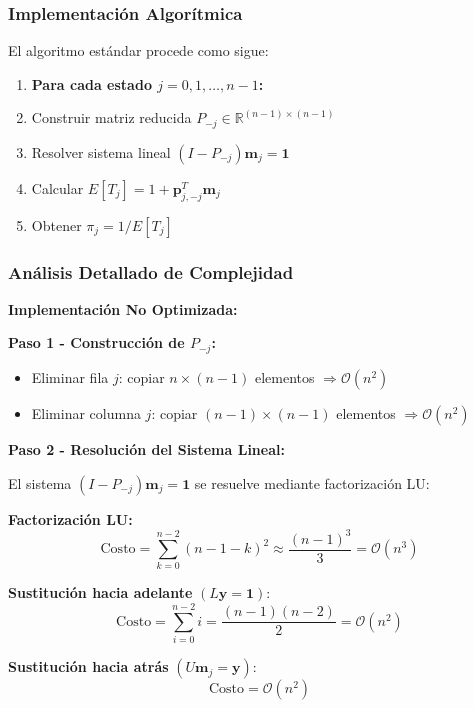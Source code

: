 \subsubsection{Implementación Algorítmica}

El algoritmo estándar procede como sigue:

\begin{enumerate}
\item \textbf{Para cada estado $j = 0, 1, \ldots, n-1$:}
\item Construir matriz reducida $P_{-j} \in \mathbb{R}^{(n-1) \times (n-1)}$
\item Resolver sistema lineal $(I - P_{-j}) \mathbf{m}_j = \mathbf{1}$
\item Calcular $E[T_j] = 1 + \mathbf{p}_{j,-j}^T \mathbf{m}_j$
\item Obtener $\pi_j = 1/E[T_j]$
\end{enumerate}

\subsubsection{Análisis Detallado de Complejidad}

\textbf{Implementación No Optimizada:}

\textbf{Paso 1 - Construcción de $P_{-j}$:}
\begin{itemize}
\item Eliminar fila $j$: copiar $n \times (n-1)$ elementos $\Rightarrow \mathcal{O}(n^2)$
\item Eliminar columna $j$: copiar $(n-1) \times (n-1)$ elementos $\Rightarrow \mathcal{O}(n^2)$
\end{itemize}

\textbf{Paso 2 - Resolución del Sistema Lineal:}

El sistema $(I - P_{-j}) \mathbf{m}_j = \mathbf{1}$ se resuelve mediante factorización LU:

\textbf{Factorización LU:}
\begin{equation}
\text{Costo} = \sum_{k=0}^{n-2} (n-1-k)^2 \approx \frac{(n-1)^3}{3} = \mathcal{O}(n^3)
\end{equation}

\textbf{Sustitución hacia adelante} $(L\mathbf{y} = \mathbf{1})$:
\begin{equation}
\text{Costo} = \sum_{i=0}^{n-2} i = \frac{(n-1)(n-2)}{2} = \mathcal{O}(n^2)
\end{equation}

\textbf{Sustitución hacia atrás} $(U\mathbf{m}_j = \mathbf{y})$:
\begin{equation}
\text{Costo} = \mathcal{O}(n^2)
\end{equation}

